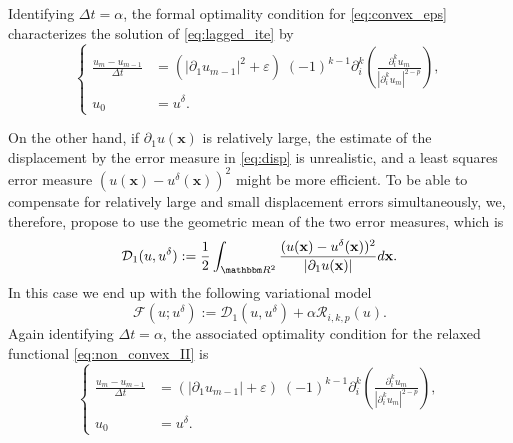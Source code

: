 \documentclass[runningheads,a4paper]{llncs}\usepackage{latexsym}
\newcommand{\R}{\mathbbm R}
\newcommand{\ve}{\varepsilon}
\newcommand{\ud}{u^\delta}
\newcommand{\abs}[1]{\left| #1 \right|}
\begin{document}
Identifying $\Delta t = \alpha$, the formal optimality condition for \eqref{eq:convex_eps} 
characterizes the solution of \eqref{eq:lagged_ite} by
\begin{equation} \label{eq:explicit_flow}
 \left\{ \begin{aligned}
  \frac{u_m -u_{m-1}}{\Delta t} &= 
  (\abs{\partial_1 u_{m-1}}^2+\ve) \;(-1)^{k-1} \partial_i^k \left(\frac{\partial_i^k u_m}{\abs{\partial_i^k u_m}^{2-p}} \right),\\
  u_0 &=\ud.
 \end{aligned}\right.
\end{equation}

On the other hand, if $\partial_1 u(\mathbf{x})$ is relatively large,
the estimate of the displacement by the error measure in \eqref{eq:disp} is unrealistic, 
and a least squares error measure $(u(\mathbf{x})-\ud(\mathbf{x}))^2$ might be more efficient. 
To be able to compensate for relatively large and small displacement errors simultaneously, we, therefore, propose to use the 
geometric mean of the two error measures, which is
\begin{equation}
\label{eq:data1}
 \mathcal{D}_1(u,\ud):= \frac{1}{2}\int_{\R^2}\frac{(u(\mathbf{x})-\ud(\mathbf{x}))^2}{\abs{\partial_1 u(\mathbf{x})}}d\mathbf{x}.
\end{equation}
In this case we end up with the following variational model
\begin{equation}
\label{eq:non_convex_II}
\mathcal{F}(u;\ud) :=  \mathcal{D}_1(u,\ud) + \alpha \mathcal{R}_{i,k,p}(u).
\end{equation}
Again identifying $\Delta t = \alpha$, the associated optimality condition for the relaxed functional \eqref{eq:non_convex_II} is
\begin{equation} \label{eq:explicit_flow_II}
 \left\{ \begin{aligned}
  \frac{u_m -u_{m-1}}{\Delta t} &= 
  (\abs{\partial_1 u_{m-1}}+\ve) \;(-1)^{k-1} \partial_i^k \left(\frac{\partial_i^k u_m}{\abs{\partial_i^k u_m}^{2-p}} \right),\\
  u_0 &=\ud.
 \end{aligned}\right.
\end{equation}
\end{document}
